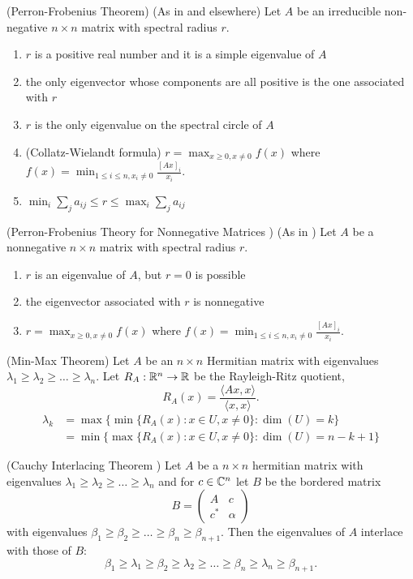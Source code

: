 \documentclass{article}
\begin{document}
\begin{theorem}{(Perron-Frobenius Theorem)} (As in \cite{Meyer:2001fk} and elsewhere) Let $A$ be an irreducible non-negative $n\times n$ matrix with spectral radius $r$.
\begin{enumerate}
\item $r$ is a positive real number and it is a simple eigenvalue of $A$
\item the only eigenvector whose components are all positive is the one associated with $r$
\item $r$ is the only eigenvalue on the spectral circle of $A$
\item (Collatz-Wielandt formula) $r=\max_{x\geq 0,x\neq 0}f(x)$ where $f(x)=\min_{1\leq i\leq n,x_i\neq 0}\frac{[Ax]_i}{x_i}.$
\item $\min_i\sum_ja_{ij}\leq r \leq \max_i\sum_ja_{ij}$
\end{enumerate}

\end{theorem}

\begin{theorem}{(Perron-Frobenius Theory for Nonnegative Matrices )} (As in \cite{Meyer:2001fk}) Let $A$ be a nonnegative $n\times n$ matrix with spectral radius $r$.  
\begin{enumerate}
\item $r$ is an eigenvalue of $A$, but $r=0$ is possible
\item the eigenvector associated with $r$ is nonnegative
\item $r=\max_{x\geq 0,x\neq 0}f(x)$ where $f(x)=\min_{1\leq i\leq n,x_i\neq 0}\frac{[Ax]_i}{x_i}.$
\end{enumerate}
\end{theorem}

\begin{theorem}{(Min-Max Theorem)} Let $A$ be an $n\times n$ Hermitian matrix with eigenvalues $\lambda_1\geq \lambda_2\geq \dots\geq\lambda_n$.  Let $R_A:{\mathbb{R}}^n\to{\mathbb{R}}$ be the Rayleigh-Ritz quotient,
$$R_A(x)=\frac{\langle Ax,x\rangle}{\langle x,x\rangle}.$$  
\begin{align*}
\lambda_k&=\max\{\min\{R_A(x):x\in U,x\neq 0\}:\dim(U)=k\}
\\ &=\min\{\max\{R_A(x):x\in U,x\neq 0\}:\dim(U)=n-k+1\}
\end{align*}
\end{theorem}

\begin{theorem}{(Cauchy Interlacing Theorem \cite{Meyer:2001fk})}
Let $A$ be a $n\times n$ hermitian matrix with eigenvalues $\lambda_1\geq \lambda_2\geq \dots\geq \lambda_n$ and for $c\in {\mathbb{C}}^{n}$ let $B$ be the bordered matrix
$$B=\left(\begin{array}{cccc} A & c \\ c^* & \alpha \end{array}\right) $$
with eigenvalues $\beta_1\geq \beta_2\geq \dots\geq \beta_n\geq \beta_{n+1}.$  Then the eigenvalues of $A$ interlace with those of $B$:
$$\beta_1\geq \lambda_1\geq \beta_2\geq \lambda_2\geq \dots\geq \beta_n\geq \lambda_n\geq\beta_{n+1}.$$
\end{theorem}
\end{document}

